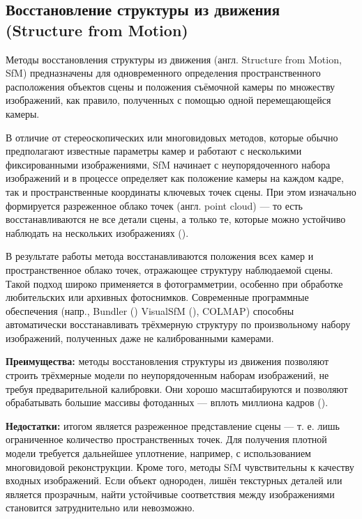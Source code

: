 \subsection{Восстановление структуры из движения (Structure from Motion)}

Методы восстановления структуры из движения (англ. Structure from Motion,
 SfM) предназначены для одновременного определения пространственного
расположения объектов сцены и положения съёмочной камеры по множеству
изображений, как правило, полученных с помощью одной перемещающейся камеры.

В отличие от стереоскопических или многовидовых методов, которые обычно
предполагают известные параметры камер и работают с несколькими фиксированными
изображениями, SfM начинает с неупорядоченного
набора изображений и в процессе определяет как положение камеры на каждом кадре,
так и пространственные координаты ключевых точек сцены. При этом изначально
формируется разреженное облако точек (англ. point cloud) — то есть восстанавливаются не все детали
сцены, а только те, которые можно устойчиво наблюдать на нескольких
изображениях (\cite{10.1109/CVPR.2016.4454}).

В результате работы метода восстанавливаются положения всех камер и
пространственное облако точек, отражающее структуру наблюдаемой сцены. Такой
подход широко применяется в фотограмметрии, особенно при обработке любительских
или архивных фотоснимков. Современные программные обеспечения (напр., Bundler
(\cite{10.1145/3596711.3596766}) VisualSfM (\cite{10.1109/3DV.2013.25}), COLMAP)
способны автоматически восстанавливать трёхмерную структуру по произвольному
набору изображений, полученных даже не калиброванными камерами.

\textbf{Преимущества:} методы восстановления структуры из движения позволяют
строить трёхмерные модели по неупорядоченным наборам изображений, не требуя
предварительной калибровки. Они хорошо масштабируются и позволяют обрабатывать
большие массивы фотоданных — вплоть миллиона кадров (\cite{10.1109/CVPR.2015.7298949}).

\textbf{Недостатки:} итогом является разреженное представление сцены — т. е.
лишь ограниченное количество пространственных точек. Для получения плотной модели
требуется дальнейшее уплотнение, например, с использованием многовидовой
реконструкции. Кроме того, методы SfM чувствительны к качеству входных
изображений. Если объект однороден, лишён текстурных деталей или является
прозрачным, найти устойчивые соответствия между изображениями становится
затруднительно или невозможно.

